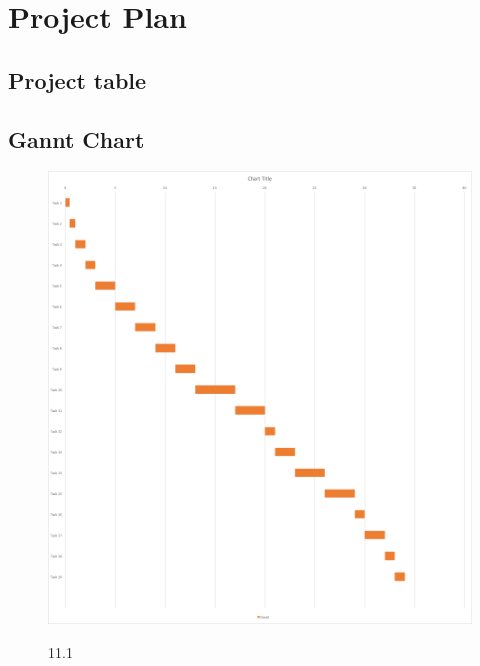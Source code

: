 \documentclass[]{report}
\begin{document}
\newpage

\section{Project Plan}
	\subsection{Project table}

\newpage

	\subsection{Gannt Chart}
		\begin{figure}[!htb]
			\includegraphics[width=\textwidth]{img4.png}
			\begin{center}
				\figurename{ 11.1}
			\end{center}
		\end{figure}
\end{document}
